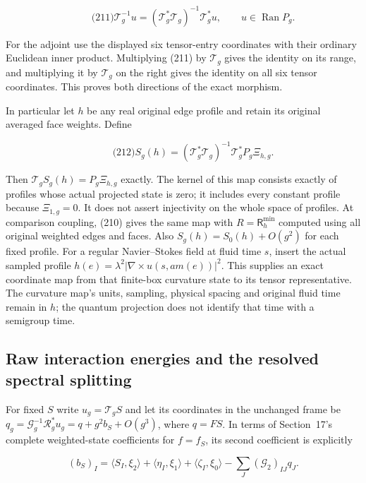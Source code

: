 \[
\qquad\text{(211)}
 \mathcal T_g^{-1}u=(\mathcal T_g^*\mathcal T_g)^{-1}
                              \mathcal T_g^*u,\qquad u\in\operatorname{Ran}P_g.
\]

For the adjoint use the displayed six tensor-entry coordinates with
their ordinary Euclidean inner product. Multiplying (211) by
\(\mathcal T_g\) gives the identity on its range, and multiplying it by
\(\mathcal T_g\) on the right gives the identity on all six tensor
coordinates. This proves both directions of the exact morphism.

In particular let \(h\) be any real original edge profile and retain its
original averaged face weights. Define

\[
\qquad\text{(212)}
 S_g(h)=(\mathcal T_g^*\mathcal T_g)^{-1}\mathcal T_g^*
                                   P_g\Xi_{h,g}.
\]

Then \(\mathcal T_gS_g(h)=P_g\Xi_{h,g}\) exactly. The kernel of this map
consists exactly of profiles whose actual projected state is zero; it
includes every constant profile because \(\Xi_{1,g}=0\). It does not
assert injectivity on the whole space of profiles. At comparison
coupling, (210) gives the same map with \(R=\mathsf R_h^{\min}\)
computed using all original weighted edges and faces. Also
\(S_g(h)=S_0(h)+O(g^2)\) for each fixed profile. For a regular
Navier--Stokes field at fluid time \(s\), insert the actual sampled
profile \(h(e)=\lambda^2|\nabla\times u(s,a m(e))|^2\). This supplies an
exact coordinate map from that finite-box curvature state to its tensor
representative. The curvature map's units, sampling, physical spacing
and original fluid time remain in \(h\); the quantum projection does not
identify that time with a semigroup time.

\subsection{Raw interaction energies and the resolved spectral
splitting}\label{interacting-tensor-band-md-raw-interaction-energies-and-the-resolved-spectral-splitting}

For fixed \(S\) write \(u_g=\mathcal T_gS\) and let its coordinates in
the unchanged frame be
\(q_g=\mathcal G_g^{-1}\mathcal R_g^*u_g=q+g^2b_S+O(g^3)\), where
\(q=FS\). In terms of Section~17's complete weighted-state coefficients
for \(f=f_S\), its second coefficient is explicitly

\[
(b_S)_I=\langle S_I,\xi_2\rangle+\langle\eta_I,\xi_1\rangle
       +\langle\zeta_I,\xi_0\rangle
       -\sum_J(\mathcal G_2)_{IJ}q_J.
\]

